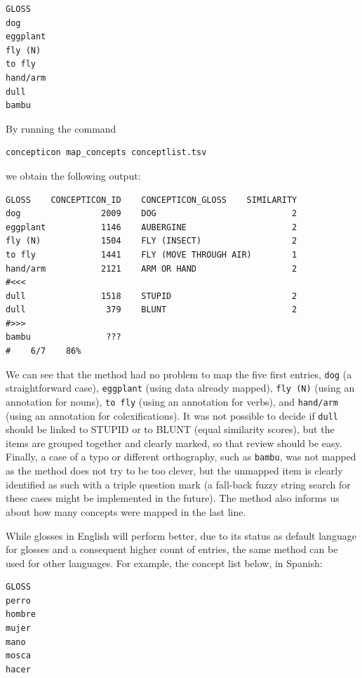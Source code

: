 \documentclass[
  a4paper,
  14pt,
  oneside,
  tablecaptionabove
]{scrbook}
\newcommand{\passthrough}[1]{#1}
\begin{document}
\begin{lstlisting}
GLOSS
dog
eggplant
fly (N)
to fly
hand/arm
dull
bambu
\end{lstlisting}

By running the command

\begin{lstlisting}
concepticon map_concepts conceptlist.tsv
\end{lstlisting}

we obtain the following output:

\begin{lstlisting}
GLOSS    CONCEPTICON_ID    CONCEPTICON_GLOSS    SIMILARITY
dog                2009    DOG                           2
eggplant           1146    AUBERGINE                     2
fly (N)            1504    FLY (INSECT)                  2
to fly             1441    FLY (MOVE THROUGH AIR)        1
hand/arm           2121    ARM OR HAND                   2
#<<<
dull               1518    STUPID                        2
dull                379    BLUNT                         2
#>>>
bambu               ???
#    6/7    86%
\end{lstlisting}

We can see that the method had no problem to map the five first
entries,
\passthrough{\lstinline!dog!} (a straightforward case),
\passthrough{\lstinline!eggplant!} (using data already mapped),
\passthrough{\lstinline!fly (N)!} (using an annotation for nouns),
\passthrough{\lstinline!to fly!} (using an annotation for verbs), and
\passthrough{\lstinline!hand/arm!} (using an annotation for
colexifications). It was not possible to decide if
\passthrough{\lstinline!dull!} should be linked to STUPID or to BLUNT
(equal similarity scores), but the items are grouped together and
clearly marked, so that review should be easy. Finally, a case of a typo
or different orthography, such as \passthrough{\lstinline!bambu!}, was
not mapped as the method does not try to be too clever, but the unmapped
item is clearly identified as such with a triple question mark (a
fall-back fuzzy string search for these cases might be implemented in
the future). The method also informs us about how many concepts were
mapped in the last line.

While glosses in English will perform better, due to its status as
default language for glosses and a consequent higher count of entries,
the same method can be used for other languages. For example, the
concept list below, in Spanish:

\begin{lstlisting}
GLOSS
perro
hombre
mujer
mano
mosca
hacer
\end{lstlisting}
\end{document}
